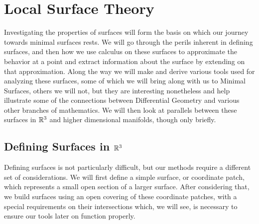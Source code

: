 \section{Local Surface Theory}

Investigating the properties of surfaces will form the basis on which our journey towards minimal surfaces rests. We will go through the perils inherent in defining surfaces, and then how we use calculus on these surfaces to approximate the behavior at a point and extract information about the surface by extending on that approximation. Along the way we will make and derive various tools used for analyzing these surfaces, some of which we will bring along with us to Minimal Surfaces, others we will not, but they are interesting nonetheless and help illustrate some of the connections between Differential Geometry and various other branches of mathematics. We will then look at parallels between these surfaces in $\mathbb{R}^3$ and higher dimensional manifolds, though only briefly.

\subsection{Defining Surfaces in $\mathbb{R}^3$}

Defining surfaces is not particularly difficult, but our methods require a different set of considerations. We will first define a simple surface, or coordinate patch, which represents a small open section of a larger surface. After considering that, we build surfaces using an open covering of these coordinate patches, with a special requirements on their intersections which, we will see, is necessary to ensure our tools later on function properly.

